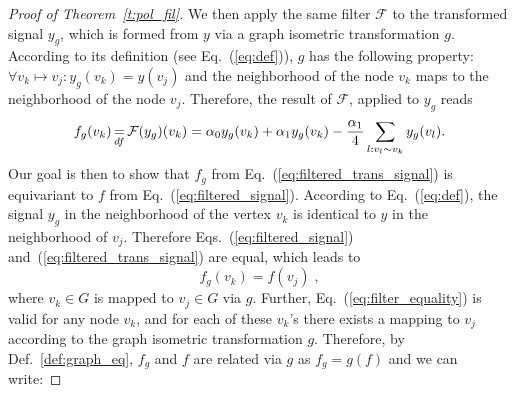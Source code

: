 \documentclass[10pt,journal,compsoc]{IEEEtran}
\newcommand{\df}{\mathop{=}\limits_{df}}
\begin{document}
\begin{proof}[Proof of Theorem~\ref{t:pol_fil}]
		We then apply the same filter $\mathcal{F}$ to the transformed signal $y_g$, which is formed from $y$ via a graph isometric transformation $g$. According to its definition (see Eq.~(\ref{eq:def})), $g$ has the following property: $\forall v_k \mapsto v_j : y_g(v_k) = y(v_j)$ and the neighborhood of the node $v_k$ maps to the neighborhood of the node $v_j$. %
		Therefore, the result of $\mathcal{F}$, applied to $y_g$ reads 
		\begin{equation}
		\small
		f_g(v_k) \df \mathcal{F}(y_g)(v_k) = \alpha_0 y_g(v_k) + \alpha_1 y_g(v_k) - \frac{\alpha_1}{4} \sum\limits_{l: v_l \sim v_k} y_g(v_l).
		\label{eq:filtered_trans_signal}
		\end{equation}
		Our goal is then to show that $f_g$ from Eq.~(\ref{eq:filtered_trans_signal}) is equivariant to $f$ from Eq.~(\ref{eq:filtered_signal}). 		
		According to Eq.~(\ref{eq:def}), the signal $y_g$ in the neighborhood of the vertex $v_k$ is identical to $y$ in the neighborhood of $v_j$. Therefore Eqs.~(\ref{eq:filtered_signal}) and~(\ref{eq:filtered_trans_signal}) are equal, which leads to 
		\begin{equation}
		f_g(v_k) = f(v_j)\;,
		\label{eq:filter_equality}
		\end{equation}
		\noindent
		where $v_k \in G$ is mapped to $v_j \in G$ via $g$.
		Further, Eq.~(\ref{eq:filter_equality}) is valid for any node $v_k$, and for each of these $v_k$'s there exists a mapping to $v_j$ according to the graph isometric transformation $g$. Therefore, by Def.~\ref{def:graph_eq}, $f_g$ and $f$ are related via $g$ as $f_g = g(f)$ and we can write:
		

\end{proof}
\end{document}
